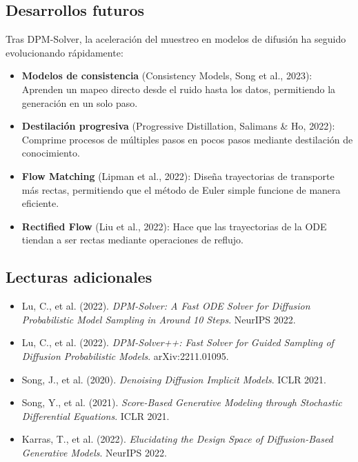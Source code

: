 \subsection{Desarrollos futuros}

Tras DPM-Solver, la aceleración del muestreo en modelos de difusión ha seguido evolucionando rápidamente:

\begin{itemize}
    \item \textbf{Modelos de consistencia} (Consistency Models, Song et al., 2023): Aprenden un mapeo directo desde el ruido hasta los datos, permitiendo la generación en un solo paso.
    \item \textbf{Destilación progresiva} (Progressive Distillation, Salimans \& Ho, 2022): Comprime procesos de múltiples pasos en pocos pasos mediante destilación de conocimiento.
    \item \textbf{Flow Matching} (Lipman et al., 2022): Diseña trayectorias de transporte más rectas, permitiendo que el método de Euler simple funcione de manera eficiente.
    \item \textbf{Rectified Flow} (Liu et al., 2022): Hace que las trayectorias de la ODE tiendan a ser rectas mediante operaciones de reflujo.
\end{itemize}

\subsection{Lecturas adicionales}

\begin{itemize}
    \item Lu, C., et al. (2022). \textit{DPM-Solver: A Fast ODE Solver for Diffusion Probabilistic Model Sampling in Around 10 Steps}. NeurIPS 2022.
    \item Lu, C., et al. (2022). \textit{DPM-Solver++: Fast Solver for Guided Sampling of Diffusion Probabilistic Models}. arXiv:2211.01095.
    \item Song, J., et al. (2020). \textit{Denoising Diffusion Implicit Models}. ICLR 2021.
    \item Song, Y., et al. (2021). \textit{Score-Based Generative Modeling through Stochastic Differential Equations}. ICLR 2021.
    \item Karras, T., et al. (2022). \textit{Elucidating the Design Space of Diffusion-Based Generative Models}. NeurIPS 2022.
\end{itemize}



